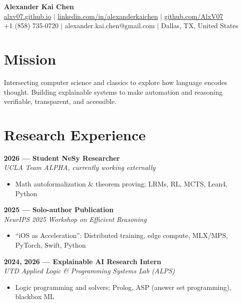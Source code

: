 \documentclass[11pt]{article}
\begin{document}
\begin{center}
    {\LARGE \textbf{Alexander Kai Chen}} \\[0.37em]
    \href{http://alxv07.github.io}{alxv07.github.io} $|$
    \href{https://linkedin.com/in/alexanderkaichen}{linkedin.com/in/alexanderkaichen} $|$
    \href{https://github.com/AlxV07}{github.com/AlxV07} \\[0.15em]
    +1 (858) 735-0720 $|$ alexander.kai.chen@gmail.com $|$ Dallas, TX, United States \\[1.3em]
\end{center}

\section*{Mission}

Intersecting computer science and classics to explore how language encodes thought. Building explainable systems to make automation and reasoning verifiable, transparent, and accessible.

\vspace{0.4em}
\section*{Research Experience}

    \textbf{2026 --- Student NeSy Researcher} \\
    \textit{UCLA Team ALPHA, currently working externally}
    \vspace{-0.5em}
    \begin{itemize}
        \item Math autoformalization \& theorem proving; LRMs, RL, MCTS, Lean4, Python
    \end{itemize}

    \vspace{0.25em}
    \textbf{2025 --- Solo-author Publication} \\
    \textit{NeurIPS 2025 Workshop on Efficient Reasoning}
    \vspace{-0.5em}
    \begin{itemize}
        \item ``iOS as Acceleration'': Distributed training, edge compute, MLX/MPS, PyTorch, Swift, Python
    \end{itemize}

    \vspace{0.25em}
    \textbf{2024, 2026 --- Explainable AI Research Intern} \\
    \textit{UTD Applied Logic \& Programming Systems Lab (ALPS)}
    \vspace{-0.5em}
    \begin{itemize}
        \item Logic programming and solvers; Prolog, ASP (answer set programming), blackbox ML
    \end{itemize}
\end{document}
